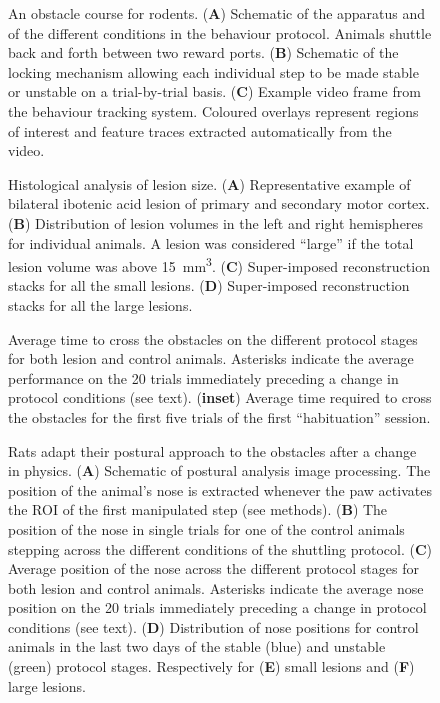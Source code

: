
\begin{figure}
\centering

\caption{An obstacle course for rodents. (\textbf{A}) Schematic of the apparatus and of the different conditions in the behaviour protocol. Animals shuttle back and forth between two reward ports. (\textbf{B}) Schematic of the locking mechanism allowing each individual step to be made stable or unstable on a trial-by-trial basis. (\textbf{C}) Example video frame from the behaviour tracking system. Coloured overlays represent regions of interest and feature traces extracted automatically from the video. }
\label{fig:assay}
\end{figure}

\begin{figure}
\centering

\caption{Histological analysis of lesion size. (\textbf{A}) Representative example of bilateral ibotenic acid lesion of primary and secondary motor cortex. (\textbf{B}) Distribution of lesion volumes in the left and right hemispheres for individual animals. A lesion was considered ``large'' if the total lesion volume was above \SI{15}{\milli\meter\cubed}. (\textbf{C}) Super-imposed reconstruction stacks for all the small lesions. (\textbf{D}) Super-imposed reconstruction stacks for all the large lesions.}
\label{fig:histology}
\end{figure}

\begin{figure}
\centering

\caption{Average time to cross the obstacles on the different protocol stages for both lesion and control animals. Asterisks indicate the average performance on the 20 trials immediately preceding a change in protocol conditions (see text). (\textbf{inset}) Average time required to cross the obstacles for the first five trials of the first ``habituation'' session.}
\label{fig:learning}
\end{figure}

\begin{figure}
\centering

\caption{Rats adapt their postural approach to the obstacles after a change in physics. (\textbf{A}) Schematic of postural analysis image processing. The position of the animal's nose is extracted whenever the paw activates the ROI of the first manipulated step (see methods). (\textbf{B}) The position of the nose in single trials for one of the control animals stepping across the different conditions of the shuttling protocol. (\textbf{C}) Average position of the nose across the different protocol stages for both lesion and control animals. Asterisks indicate the average nose position on the 20 trials immediately preceding a change in protocol conditions (see text). (\textbf{D}) Distribution of nose positions for control animals in the last two days of the stable (blue) and unstable (green) protocol stages. Respectively for (\textbf{E}) small lesions and (\textbf{F}) large lesions.}
\label{fig:posture}
\end{figure}

